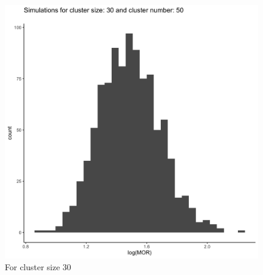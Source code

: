 \documentclass[
  letterpaper,
  DIV=11,
  numbers=noendperiod,
  titlepage]{scrartcl}
\begin{document}
\begin{figure}
\begin{minipage}[t]{0.50\linewidth}
{{\includegraphics{../plots/ran-int/hist_50_30.png}

}

\caption{For cluster size 30}

}

\end{minipage}%
%
\begin{minipage}[t]{0.50\linewidth}

{\centering 

}
\end{minipage}
\end{figure}
\end{document}
